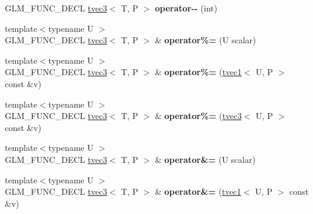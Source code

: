 \begin{DoxyCompactItemize}
\item 
\hypertarget{structglm_1_1tvec3_abc0a890711331ebd0769c133824572bc}{G\-L\-M\-\_\-\-F\-U\-N\-C\-\_\-\-D\-E\-C\-L \hyperlink{structglm_1_1tvec3}{tvec3}$<$ T, P $>$ {\bfseries operator-\/-\/} (int)}\label{structglm_1_1tvec3_abc0a890711331ebd0769c133824572bc}

\item 
\hypertarget{structglm_1_1tvec3_a627465a3f104107ba25349a842e8aa61}{{\footnotesize template$<$typename U $>$ }\\G\-L\-M\-\_\-\-F\-U\-N\-C\-\_\-\-D\-E\-C\-L \hyperlink{structglm_1_1tvec3}{tvec3}$<$ T, P $>$ \& {\bfseries operator\%=} (U scalar)}\label{structglm_1_1tvec3_a627465a3f104107ba25349a842e8aa61}

\item 
\hypertarget{structglm_1_1tvec3_a4bad68930d445ca78624dee131d95e15}{{\footnotesize template$<$typename U $>$ }\\G\-L\-M\-\_\-\-F\-U\-N\-C\-\_\-\-D\-E\-C\-L \hyperlink{structglm_1_1tvec3}{tvec3}$<$ T, P $>$ \& {\bfseries operator\%=} (\hyperlink{structglm_1_1tvec1}{tvec1}$<$ U, P $>$ const \&v)}\label{structglm_1_1tvec3_a4bad68930d445ca78624dee131d95e15}

\item 
\hypertarget{structglm_1_1tvec3_abb9bf8c109aa14bc40356f31eba946b0}{{\footnotesize template$<$typename U $>$ }\\G\-L\-M\-\_\-\-F\-U\-N\-C\-\_\-\-D\-E\-C\-L \hyperlink{structglm_1_1tvec3}{tvec3}$<$ T, P $>$ \& {\bfseries operator\%=} (\hyperlink{structglm_1_1tvec3}{tvec3}$<$ U, P $>$ const \&v)}\label{structglm_1_1tvec3_abb9bf8c109aa14bc40356f31eba946b0}

\item 
\hypertarget{structglm_1_1tvec3_a94c9bcda41aaad94c8ea1c2331dab436}{{\footnotesize template$<$typename U $>$ }\\G\-L\-M\-\_\-\-F\-U\-N\-C\-\_\-\-D\-E\-C\-L \hyperlink{structglm_1_1tvec3}{tvec3}$<$ T, P $>$ \& {\bfseries operator\&=} (U scalar)}\label{structglm_1_1tvec3_a94c9bcda41aaad94c8ea1c2331dab436}

\item 
\hypertarget{structglm_1_1tvec3_ad5a0fe7dd37fff314dd01d79887f02be}{{\footnotesize template$<$typename U $>$ }\\G\-L\-M\-\_\-\-F\-U\-N\-C\-\_\-\-D\-E\-C\-L \hyperlink{structglm_1_1tvec3}{tvec3}$<$ T, P $>$ \& {\bfseries operator\&=} (\hyperlink{structglm_1_1tvec1}{tvec1}$<$ U, P $>$ const \&v)}\label{structglm_1_1tvec3_ad5a0fe7dd37fff314dd01d79887f02be}


\end{DoxyCompactItemize}
